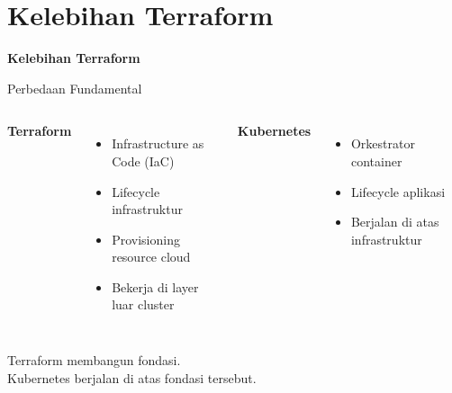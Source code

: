 \documentclass[aspectratio=169, table]{beamer}
\begin{document}
\section{Kelebihan Terraform}
\begin{frame}{\hfill}
	\centering
	\Huge{\textbf{Kelebihan Terraform}}
\end{frame}

\begin{frame}{Perbedaan Fundamental}
\vspace{10pt}
\begin{columns}[T]

\textbf{Terraform}
\begin{itemize}
    \item Infrastructure as Code (IaC)
    \item Lifecycle infrastruktur
    \item Provisioning resource cloud
    \item Bekerja di layer luar cluster
\end{itemize}

\textbf{Kubernetes}
\begin{itemize}
    \item Orkestrator container
    \item Lifecycle aplikasi
    \item Berjalan di atas infrastruktur
\end{itemize}

\end{columns}

\vspace{8pt}
Terraform membangun fondasi.\\
Kubernetes berjalan di atas fondasi tersebut.
\end{frame}
\end{document}

